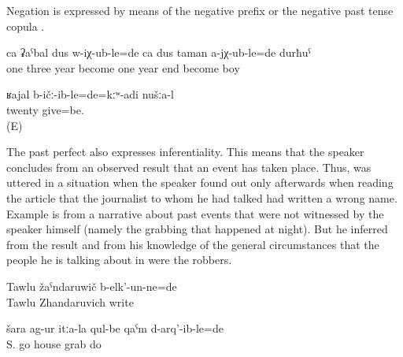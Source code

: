 Negation is expressed by means of the negative prefix   or the negative past tense copula  .

\begin{exe}
	\ex	\label{ex:‎One boy had turned three, the other was not even one year old analytic}
	\gll	ca	ʡaˁbal	dus	w-iχ-ub-le=de	ca	dus	taman	a-jχ-ub-le=de	durħuˁ\\
		one	three	year	become		one	year	end	become	boy\\
	\glt	{}

	\ex	\label{ex:‎ ‎‎We had not given twenty analytic}
	\gll	ʁajal	b-ičː-ib-le=de=kːʷ-adi	nušːa-l\\
		twenty	give=be.	\\
	\glt	{} (E)
\end{exe}

The past perfect also expresses inferentiality. This means that the speaker concludes from an observed result that an event has taken place. Thus,  was uttered in a situation when the speaker found out only afterwards when reading the article that the journalist to whom he had talked had written a wrong name. Example  is from a narrative about past events that were not witnessed by the speaker himself (namely the grabbing that happened at night). But he inferred from the result and from his knowledge of the general circumstances that the people he is talking about in  were the robbers.
%
\begin{exe}
	\ex	\label{ex:(He) had (apparently) written Tawlu Zhandaruvich}
	\gll	Tawlu	žaˁndaruwič	b-elk'-un-ne=de\\
		Tawlu	Zhandaruvich	write\\
	\glt	{}

	\ex	\label{ex:‎They went to Shara and had grabbed their houses}
	\gll	šara	ag-ur	itːa-la	qul-be	qaˁm	d-arq'-ib-le=de\\
		S.	go		house	grab	do\\
	\glt	{}
\end{exe}

